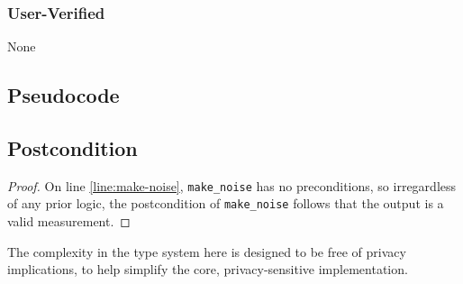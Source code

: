 \documentclass{article}
\begin{document}
\subsubsection*{User-Verified}
None

\subsection*{Pseudocode}


\subsection*{Postcondition}
\begin{theorem}
\end{theorem}

\begin{proof}
    On line \ref{line:make-noise}, \texttt{make\_noise} has no preconditions, 
    so irregardless of any prior logic,
    the postcondition of \texttt{make\_noise} follows that the output is a valid measurement.
\end{proof}

The complexity in the type system here is designed to be free of privacy implications,
to help simplify the core, privacy-sensitive implementation.
\end{document}
